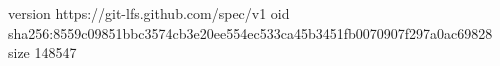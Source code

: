 version https://git-lfs.github.com/spec/v1
oid sha256:8559c09851bbc3574cb3e20ee554ec533ca45b3451fb0070907f297a0ac69828
size 148547
